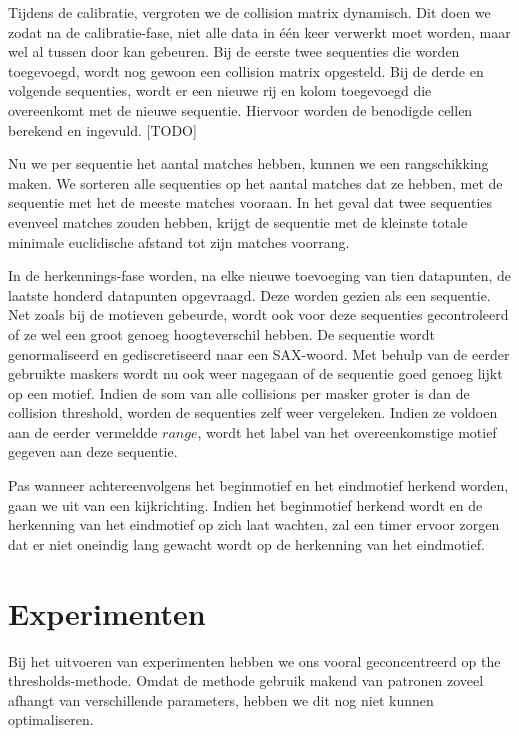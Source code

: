\documentclass{article}
\begin{document}
Tijdens de calibratie, vergroten we de collision matrix dynamisch. Dit doen we zodat na de calibratie-fase, niet alle data in één keer verwerkt moet worden, maar wel al tussen door kan gebeuren. Bij de eerste twee sequenties die worden toegevoegd, wordt nog gewoon een collision matrix opgesteld. Bij de derde en volgende sequenties, wordt er een nieuwe rij en kolom toegevoegd die overeenkomt met de nieuwe sequentie. Hiervoor worden de benodigde cellen berekend en ingevuld. [TODO]

Nu we per sequentie het aantal matches hebben, kunnen we een rangschikking maken. We sorteren alle sequenties op het aantal matches dat ze hebben, met de sequentie met het de meeste matches vooraan. In het geval dat twee sequenties evenveel matches zouden hebben, krijgt de sequentie met de kleinste totale minimale euclidische afstand tot zijn matches voorrang.

In de herkennings-fase worden, na elke nieuwe toevoeging van tien datapunten, de laatste honderd datapunten opgevraagd. Deze worden gezien als een sequentie. Net zoals bij de motieven gebeurde, wordt ook voor deze sequenties gecontroleerd of ze wel een groot genoeg hoogteverschil hebben. De sequentie wordt genormaliseerd en gediscretiseerd naar een SAX-woord. Met behulp van de eerder gebruikte maskers wordt nu ook weer nagegaan of de sequentie goed genoeg lijkt op een motief. Indien de som van alle collisions per masker groter is dan de collision threshold, worden de sequenties zelf weer vergeleken. Indien ze voldoen aan de eerder vermeldde $range$, wordt het label van het overeenkomstige motief gegeven aan deze sequentie.

Pas wanneer achtereenvolgens het beginmotief en het eindmotief herkend worden, gaan we uit van een kijkrichting. Indien het beginmotief herkend wordt en de herkenning van het eindmotief op zich laat wachten, zal een timer ervoor zorgen dat er niet oneindig lang gewacht wordt op de herkenning van het eindmotief.


\section{Experimenten}

Bij het uitvoeren van experimenten hebben we ons vooral geconcentreerd op the thresholds-methode. Omdat de methode gebruik makend van patronen zoveel afhangt van verschillende parameters, hebben we dit nog niet kunnen optimaliseren.
\end{document}
